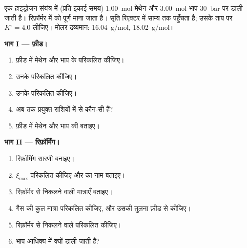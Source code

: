 \begin{problem}
\label{pb:b1:extent-q-and-k:1}
एक हाइड्रोजन संयंत्र में (प्रति इकाई समय) \qty{1.00}{mol} मेथेन और
\qty{3.00}{mol} भाप \qty{30}{bar} पर डाली जाती है।
रिफ़ॉर्मर में  को पूर्ण माना जाता है। सृति
रिएक्टर में  साम्य तक पहुँचता है; उसके ताप पर $K^\circ =
4.0$ लीजिए। मोलर द्रव्यमान:  \qty{16.04}{g/mol},
 \qty{18.02}{g/mol}।

\medskip
\noindent\textbf{भाग I --- फ़ीड।}
\begin{enumerate}
  \item फ़ीड में मेथेन और भाप के  परिकलित कीजिए।
  \item उनके  परिकलित कीजिए।
  \item उनके  परिकलित कीजिए।
  \item अब तक प्रयुक्त राशियों में से कौन-सी  हैं?
  \item फ़ीड में मेथेन और भाप की  बताइए।
\end{enumerate}

\medskip
\noindent\textbf{भाग II --- रिफ़ॉर्मिंग।}
\begin{enumerate}[resume]
  \item रिफ़ॉर्मिंग  सारणी बनाइए।
  \item $\xi_{\max}$ परिकलित कीजिए और  का नाम बताइए।
  \item रिफ़ॉर्मर से निकलने वाली मात्राएँ बताइए।
  \item गैस की कुल मात्रा परिकलित कीजिए, और उसकी तुलना फ़ीड से कीजिए।
  \item रिफ़ॉर्मर से निकलने वाले  परिकलित कीजिए।
  \item भाप आधिक्य में क्यों डाली जाती है?
\end{enumerate}


\end{problem}
